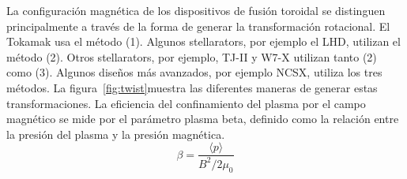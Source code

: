 \par
La configuración magnética de los dispositivos de fusión toroidal se distinguen principalmente
a través de la forma de generar la transformación rotacional. El Tokamak
usa el método (1). Algunos stellarators, por ejemplo el LHD, utilizan el método (2). Otros stellarators, por 
ejemplo, TJ-II y W7-X utilizan tanto (2) como (3). Algunos diseños más avanzados, por ejemplo
NCSX, utiliza los tres métodos. La figura~\ref{fig:twist}muestra las diferentes maneras de generar estas transformaciones.
La eficiencia del confinamiento del plasma por el campo magnético se mide por
el parámetro plasma beta, definido como la relación entre la presión del plasma y la presión magnética.
\begin{equation}\label{eq:beta}
    \beta=\frac{\langle p\rangle}{B^2/2\mu_0}
\end{equation}

